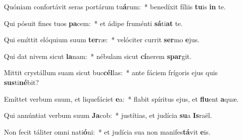 \item Quóniam confortávit seras portárum tu\textbf{á}rum:~* benedíxit fíliis \textbf{tu}is \textbf{in} te.
\item Qui pósuit fines tuos \textbf{pa}cem:~* et ádipe fruménti \textbf{sá}ti\textbf{at} te.
\item Qui emíttit elóquium suum \textbf{ter}ræ:~* velóciter currit \textbf{ser}mo \textbf{e}jus.
\item Qui dat nivem sicut \textbf{la}nam:~* nébulam sicut \textbf{cí}nerem \textbf{spar}git.
\item Mittit crystállum suam sicut buc\textbf{cél}las:~* ante fáciem frígoris ejus quis \textbf{sus}ti\textbf{né}bit?
\item Emíttet verbum suum, et liquefáciet \textbf{e}a:~* flabit spíritus ejus, et \textbf{flu}ent \textbf{a}quæ.
\item Qui annúntiat verbum suum \textbf{Ja}cob:~* justítias, et judícia \textbf{su}a \textbf{Is}raël.
\item Non fecit táliter omni nati\textbf{ó}ni:~* et judícia sua non manifes\textbf{tá}vit \textbf{e}is.
